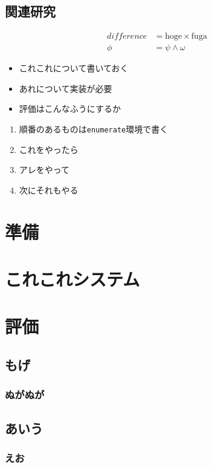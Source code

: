 \documentclass[uplatex,a4paper,12pt]{ujreport}
\begin{document}
\section{関連研究}

\begin{align}
    \mathit{difference} &= \mathrm{hoge} \times \mathrm{fuga} \\
    \phi &= \psi \wedge \omega
\end{align}


\begin{itemize}
    \item これこれについて書いておく
    \item あれについて実装が必要
    \item 評価はこんなふうにするか
\end{itemize}

\begin{enumerate}
    \item 順番のあるものは\verb|enumerate|環境で書く
    \item これをやったら
    \item アレをやって
    \item 次にそれもやる
\end{enumerate}

\chapter{準備}

\chapter{これこれシステム}

\chapter{評価}
\section{もげ}
\subsection{ぬがぬが}
\section{あいう}
\subsection{えお}
\end{document}

